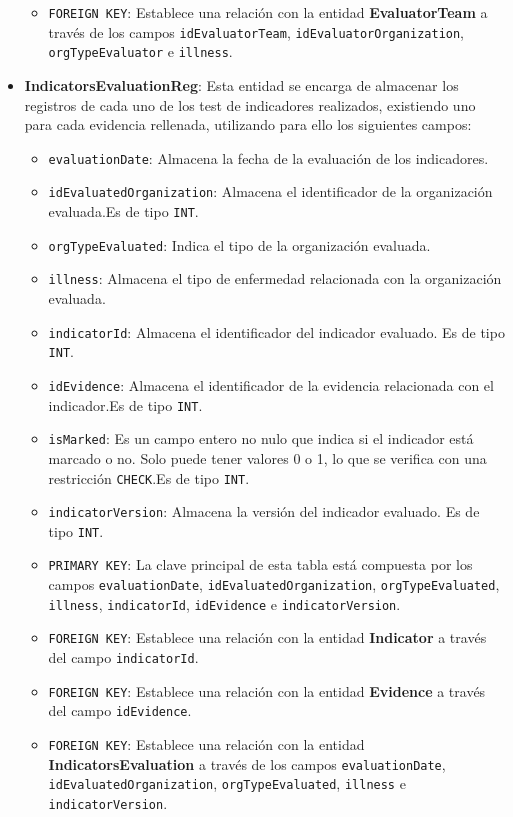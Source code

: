 \begin{itemize}
\begin{itemize}
      \item \texttt{FOREIGN KEY}: Establece una relación con la entidad \textbf{EvaluatorTeam} a través de los campos \texttt{idEvaluatorTeam}, \texttt{idEvaluatorOrganization}, \texttt{orgTypeEvaluator} e \texttt{illness}.
    \end{itemize}
    \item \textbf{IndicatorsEvaluationReg}: Esta entidad se encarga de almacenar los registros de cada uno de los test de indicadores realizados, existiendo uno para cada evidencia rellenada, utilizando para ello los siguientes campos:
    \begin{itemize}
      \item \texttt{evaluationDate}: Almacena la fecha de la evaluación de los indicadores.
      \item \texttt{idEvaluatedOrganization}: Almacena el identificador de la organización evaluada.Es de tipo \texttt{INT}.
      \item \texttt{orgTypeEvaluated}: Indica el tipo de la organización evaluada.
      \item \texttt{illness}: Almacena el tipo de enfermedad relacionada con la organización evaluada.
      \item \texttt{indicatorId}: Almacena el identificador del indicador evaluado. Es de tipo \texttt{INT}.
      \item \texttt{idEvidence}: Almacena el identificador de la evidencia relacionada con el indicador.Es de tipo \texttt{INT}.
      \item \texttt{isMarked}: Es un campo entero no nulo que indica si el indicador está marcado o no. Solo puede tener valores 0 o 1, lo que se verifica con una restricción \texttt{CHECK}.Es de tipo \texttt{INT}.
      \item \texttt{indicatorVersion}: Almacena la versión del indicador evaluado. Es de tipo \texttt{INT}.
      \item \texttt{PRIMARY KEY}: La clave principal de esta tabla está compuesta por los campos \texttt{evaluationDate}, \texttt{idEvaluatedOrganization}, \texttt{orgTypeEvaluated}, \texttt{illness}, \texttt{indicatorId}, \texttt{idEvidence} e \texttt{indicatorVersion}.
      \item \texttt{FOREIGN KEY}: Establece una relación con la entidad \textbf{Indicator} a través del campo \texttt{indicatorId}.
      \item \texttt{FOREIGN KEY}: Establece una relación con la entidad \textbf{Evidence} a través del campo \texttt{idEvidence}.
      \item \texttt{FOREIGN KEY}: Establece una relación con la entidad \textbf{IndicatorsEvaluation} a través de los campos \texttt{evaluationDate}, \texttt{idEvaluatedOrganization}, \texttt{orgTypeEvaluated}, \texttt{illness} e \texttt{indicatorVersion}.
    \end{itemize}
\end{itemize}
